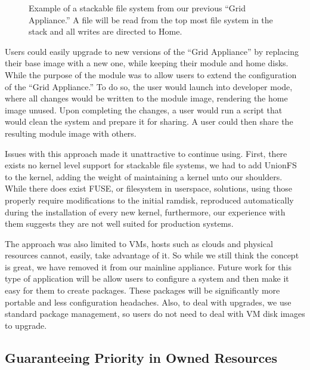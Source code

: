 \documentclass[conference]{IEEEtran}
\begin{document}
\begin{figure}[ht]
\centering
{}
\caption{Example of a stackable file system from our previous ``Grid
Appliance.''  A file will be read from the top most file system in the stack
and all writes are directed to Home.}
\label{fig:stackfs}
\end{figure}

Users could easily upgrade to new versions of the ``Grid Appliance'' by
replacing their base image with a new one, while keeping their module and home
disks.  While the purpose of the module was to allow users to extend the
configuration of the ``Grid Appliance.''  To do so, the user would launch into
developer mode, where all changes would be written to the module image,
rendering the home image unused.  Upon completing the changes, a user would run
a script that would clean the system and prepare it for sharing.  A user could
then share the resulting module image with others.

Issues with this approach made it unattractive to continue using.  First, there
exists no kernel level support for stackable file systems, we had to add
UnionFS~\cite{unionfs} to the kernel, adding the weight of maintaining a kernel
unto our shoulders.  While there does exist FUSE, or filesystem in userspace,
solutions, using those properly require modifications to the initial ramdisk,
reproduced automatically during the installation of every new kernel,
furthermore, our experience with them suggests they are not well suited for
production systems.

The approach was also limited to VMs, hosts such as clouds and physical
resources cannot, easily, take advantage of it.  So while we still think the
concept is great, we have removed it from our mainline appliance.  Future work
for this type of application will be allow users to configure a system and then
make it easy for them to create packages.  These packages will be significantly
more portable and less configuration headaches.  Also, to deal with upgrades,
we use standard package management, so users do not need to deal with VM disk
images to upgrade.

\subsection{Guaranteeing Priority in Owned Resources}
\end{document}

